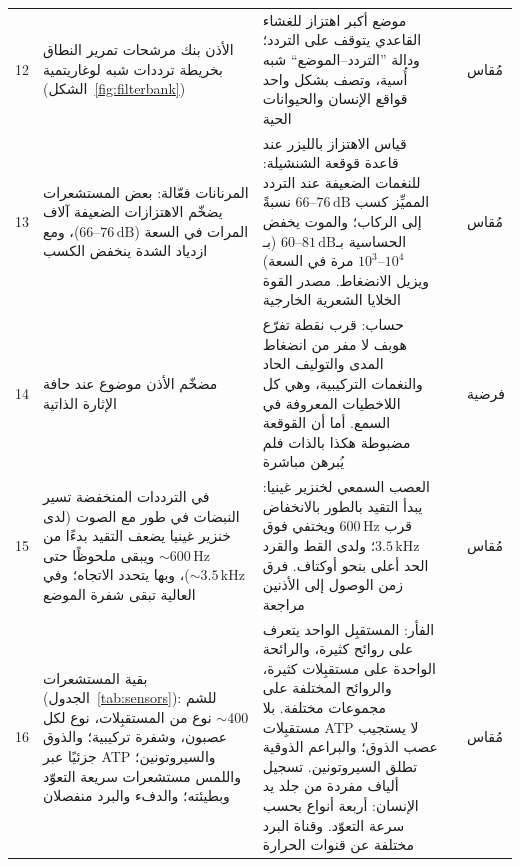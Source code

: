 {\begin{longtable}{>{\raggedright}p{0.5cm}>{\raggedright}p{4.0cm}>{\raggedright}p{5.6cm}>{\raggedright}p{2.3cm}>{\raggedright\arraybackslash}p{1.7cm}}
12 & الأذن بنك مرشحات تمرير النطاق بخريطة ترددات شبه لوغاريتمية (الشكل~\ref{fig:filterbank}) & موضع أكبر اهتزاز للغشاء القاعدي يتوقف على التردد؛ ودالة ”التردد--الموضع“ شبه أُسية، وتصف بشكل واحد قواقع الإنسان والحيوانات الحية & \cite{Greenwood1990,Robles2001} & مُقاس \\
13 & المرنانات فعّالة: بعض المستشعرات يضخّم الاهتزازات الضعيفة آلاف المرات في السعة ($66\text{--}76\,\text{dB}$)، ومع ازدياد الشدة ينخفض الكسب & قياس الاهتزاز بالليزر عند قاعدة قوقعة الشنشيلة: للنغمات الضعيفة عند التردد المميِّز كسب $66\text{--}76\,\text{dB}$ نسبةً إلى الركاب؛ والموت يخفض الحساسية بـ$60\text{--}81\,\text{dB}$ (بـ$10^3\text{--}10^4$ مرة في السعة) ويزيل الانضغاط. مصدر القوة الخلايا الشعرية الخارجية & \cite{Ruggero1997,Robles2001} & مُقاس \\
14 & مضخّم الأذن موضوع عند حافة الإثارة الذاتية & حساب: قرب نقطة تفرّع هوبف لا مفر من انضغاط المدى والتوليف الحاد والنغمات التركيبية، وهي كل اللاخطيات المعروفة في السمع. أما أن القوقعة مضبوطة هكذا بالذات فلم يُبرهن مباشرة & \cite{Eguiluz2000} & فرضية \\
15 & في الترددات المنخفضة تسير النبضات في طور مع الصوت (لدى خنزير غينيا يضعف التقيد بدءًا من $\sim600\,\text{Hz}$ ويبقى ملحوظًا حتى $\sim3.5\,\text{kHz}$)، وبها يتحدد الاتجاه؛ وفي العالية تبقى شفرة الموضع & العصب السمعي لخنزير غينيا: يبدأ التقيد بالطور بالانخفاض قرب $600\,\text{Hz}$ ويختفي فوق $3.5\,\text{kHz}$؛ ولدى القط والقرد الحد أعلى بنحو أوكتاف. فرق زمن الوصول إلى الأذنين مراجعة & \cite{PalmerRussell1986,Grothe2010} & مُقاس \\
16 & بقية المستشعرات (الجدول~\ref{tab:sensors}): للشم $\sim400$ نوع من المستقبِلات، نوع لكل عصبون، وشفرة تركيبية؛ والذوق جزئيًا عبر \foreignlanguage{english}{ATP} والسيروتونين؛ واللمس مستشعرات سريعة التعوّد وبطيئته؛ والدفء والبرد منفصلان & الفأر: المستقبِل الواحد يتعرف على روائح كثيرة، والرائحة الواحدة على مستقبِلات كثيرة، والروائح المختلفة على مجموعات مختلفة. بلا مستقبِلات \foreignlanguage{english}{ATP} لا يستجيب عصب الذوق؛ والبراعم الذوقية تطلق السيروتونين. تسجيل ألياف مفردة من جلد يد الإنسان: أربعة أنواع بحسب سرعة التعوّد. وقناة البرد مختلفة عن قنوات الحرارة & \cite{Mombaerts2004,Malnic1999,Finger2005,Huang2005,JohanssonVallbo1979,McKemy2002} & مُقاس \\
\bottomrule
\end{longtable}}
